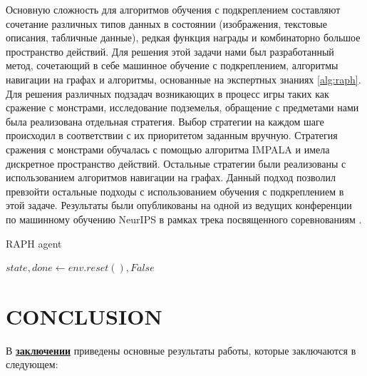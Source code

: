 Основную сложность для алгоритмов обучения с подкреплением составляют сочетание различных типов данных в состоянии (изображения, текстовые описания, табличные данные), редкая функция награды и комбинаторно большое пространство действий. Для решения этой задачи нами был разработанный метод, сочетающий в себе машинное обучение с подкреплением, алгоритмы навигации на графах и алгоритмы, основанные на экспертных знаниях \ref{alg:raph}. Для решения различных подзадач возникающих в процесс игры таких как сражение с монстрами, исследование подземелья, обращение с предметами нами была реализована отдельная стратегия. Выбор стратегии на каждом шаге происходил в соответствии с их приоритетом заданным вручную. Стратегия сражения с монстрами обучалась с помощью алгоритма IMPALA \cite{impala} и имела дискретное пространство действий. Остальные стратегии были реализованы с использованием алгоритмов навигации на графах. Данный подход позволил превзойти остальные подходы с использованием обучения с подкреплением в этой задаче. Результаты были опубликованы на одной из ведущих конференции по машинному обучению NeurIPS в рамках трека посвященного соревнованиям \cite{confbib3}.


\begin{algorithm}[ht]
\caption{RAPH agent}\label{alg:raph}
$state, done \gets env.reset(), False$\;

\end{algorithm}


\FloatBarrier
\section*{\centering CONCLUSION}
В \underline{\textbf{заключении}} приведены основные результаты работы, которые заключаются в следующем:


